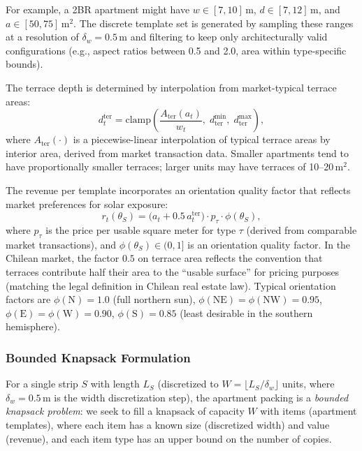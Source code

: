 \documentclass[11pt,a4paper]{article}
\begin{document}
For example, a 2BR apartment might have $w \in [7, 10]$\,m, $d \in [7,
12]$\,m, and $a \in [50, 75]$\,m$^2$. The discrete template set is
generated by sampling these ranges at a resolution of $\delta_w = 0.5$\,m
and filtering to keep only architecturally valid configurations (e.g.,
aspect ratios between 0.5 and 2.0, area within type-specific bounds).

The terrace depth is determined by interpolation from market-typical
terrace areas:
\begin{equation}
    d_t^{\text{ter}} = \text{clamp}\!\left(\frac{A_{\text{ter}}(a_t)}{w_t},\; d_{\text{ter}}^{\min},\; d_{\text{ter}}^{\max}\right),
\end{equation}
where $A_{\text{ter}}(\cdot)$ is a piecewise-linear interpolation of
typical terrace areas by interior area, derived from market transaction
data. Smaller apartments tend to have proportionally smaller terraces;
larger units may have terraces of 10--20\,m$^2$.

The revenue per template incorporates an orientation quality factor that
reflects market preferences for solar exposure:
\begin{equation}\label{eq:revenue}
    r_t(\theta_S) = \bigl(a_t + 0.5\, a_t^{\text{ter}}\bigr) \cdot p_\tau \cdot \phi(\theta_S),
\end{equation}
where $p_\tau$ is the price per usable square meter for type $\tau$
(derived from comparable market transactions), and $\phi(\theta_S) \in
(0,1]$ is an orientation quality factor. In the Chilean market, the
factor $0.5$ on terrace area reflects the convention that terraces
contribute half their area to the ``usable surface'' for pricing
purposes (matching the legal definition in Chilean real estate law).
Typical orientation factors are $\phi(\text{N}) = 1.0$ (full northern
sun), $\phi(\text{NE}) = \phi(\text{NW}) = 0.95$, $\phi(\text{E}) =
\phi(\text{W}) = 0.90$, $\phi(\text{S}) = 0.85$ (least desirable in
the southern hemisphere).

\subsubsection{Bounded Knapsack Formulation}

For a single strip $S$ with length $L_S$ (discretized to
$W = \lfloor L_S / \delta_w \rfloor$ units, where $\delta_w = 0.5$\,m
is the width discretization step), the apartment packing is a
\emph{bounded knapsack problem}: we seek to fill a knapsack of capacity
$W$ with items (apartment templates), where each item has a known size
(discretized width) and value (revenue), and each item type has an
upper bound on the number of copies.
\end{document}
